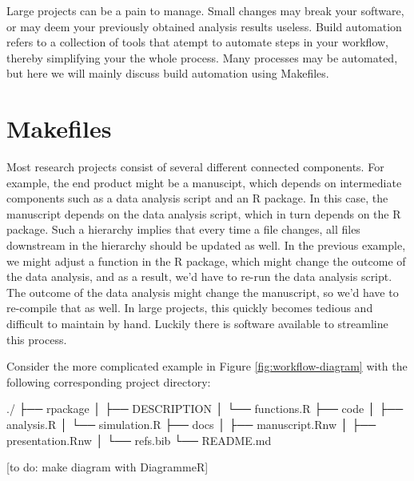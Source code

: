 \documentclass[]{book}
\newenvironment{Shaded}{\begin{snugshade}}{\end{snugshade}}
\newcommand{\ExtensionTok}[1]{#1}
\newcommand{\NormalTok}[1]{#1}
\begin{document}
Large projects can be a pain to manage. Small changes may break your
software, or may deem your previously obtained analysis results useless.
Build automation refers to a collection of tools that atempt to automate
steps in your workflow, thereby simplifying your the whole process. Many
processes may be automated, but here we will mainly discuss build
automation using Makefiles.

\section{Makefiles}\label{makefiles}

Most research projects consist of several different connected
components. For example, the end product might be a manuscipt, which
depends on intermediate components such as a data analysis script and an
R package. In this case, the manuscript depends on the data analysis
script, which in turn depends on the R package. Such a hierarchy implies
that every time a file changes, all files downstream in the hierarchy
should be updated as well. In the previous example, we might adjust a
function in the R package, which might change the outcome of the data
analysis, and as a result, we'd have to re-run the data analysis script.
The outcome of the data analysis might change the manuscript, so we'd
have to re-compile that as well. In large projects, this quickly becomes
tedious and difficult to maintain by hand. Luckily there is software
available to streamline this process.

Consider the more complicated example in Figure
\ref{fig:workflow-diagram} with the following corresponding project
directory:

\begin{Shaded}
\begin{Highlighting}[]
\ExtensionTok{./}
\NormalTok{├── }\ExtensionTok{rpackage}
\NormalTok{│   ├── }\ExtensionTok{DESCRIPTION}
\NormalTok{│   └── }\ExtensionTok{functions.R}
\NormalTok{├── }\ExtensionTok{code}
\NormalTok{│   ├── }\ExtensionTok{analysis.R}
\NormalTok{│   └── }\ExtensionTok{simulation.R}
\NormalTok{├── }\ExtensionTok{docs}
\NormalTok{│   ├── }\ExtensionTok{manuscript.Rnw}
\NormalTok{│   ├── }\ExtensionTok{presentation.Rnw}
\NormalTok{│   └── }\ExtensionTok{refs.bib}
\NormalTok{└── }\ExtensionTok{README.md}
\end{Highlighting}
\end{Shaded}

{[}to do: make diagram with DiagrammeR{]}
\end{document}
